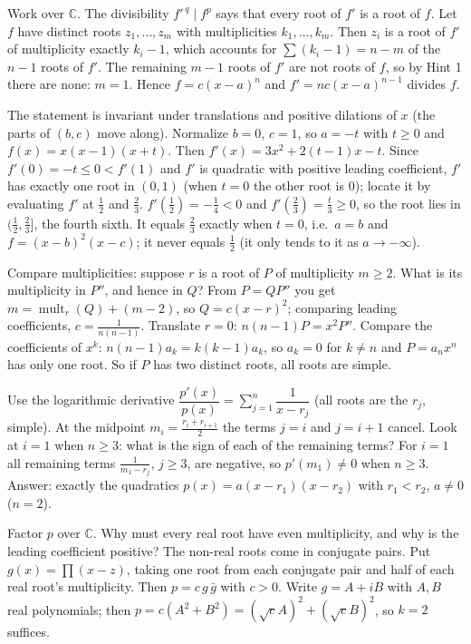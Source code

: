 \documentclass[11pt,a4paper]{article}
\begin{document}

 Work over $\mathbb{C}$. The divisibility $f'^{\,q}\mid f^p$ says that every root of $f'$ is a root of $f$.
 Let $f$ have distinct roots $z_1,\dots,z_m$ with multiplicities $k_1,\dots,k_m$. Then $z_i$ is a root of $f'$ of multiplicity exactly $k_i-1$, which accounts for $\sum(k_i-1)=n-m$ of the $n-1$ roots of $f'$.
 The remaining $m-1$ roots of $f'$ are not roots of $f$, so by Hint 1 there are none: $m=1$. Hence $f=c(x-a)^n$ and $f'=nc(x-a)^{n-1}$ divides $f$.

 The statement is invariant under translations and positive dilations of $x$ (the parts of $(b,c)$ move along). Normalize $b=0$, $c=1$, so $a=-t$ with $t\ge 0$ and $f(x)=x(x-1)(x+t)$.
 Then $f'(x)=3x^2+2(t-1)x-t$. Since $f'(0)=-t\le 0<f'(1)$ and $f'$ is quadratic with positive leading coefficient, $f'$ has exactly one root in $(0,1)$ (when $t=0$ the other root is $0$); locate it by evaluating $f'$ at $\tfrac12$ and $\tfrac23$.
 $f'(\tfrac12)=-\tfrac14<0$ and $f'(\tfrac23)=\tfrac t3\ge0$, so the root lies in $(\tfrac12,\tfrac23]$, the fourth sixth. It equals $\tfrac23$ exactly when $t=0$, i.e.\ $a=b$ and $f=(x-b)^2(x-c)$; it never equals $\tfrac12$ (it only tends to it as $a\to-\infty$).

 Compare multiplicities: suppose $r$ is a root of $P$ of multiplicity $m\ge2$. What is its multiplicity in $P''$, and hence in $Q$?
 From $P=QP''$ you get $m=\operatorname{mult}_r(Q)+(m-2)$, so $Q=c(x-r)^2$; comparing leading coefficients, $c=\frac1{n(n-1)}$.
 Translate $r=0$: $n(n-1)P=x^2P''$. Compare the coefficients of $x^k$: $n(n-1)a_k=k(k-1)a_k$, so $a_k=0$ for $k\ne n$ and $P=a_nx^n$ has only one root. So if $P$ has two distinct roots, all roots are simple.

 Use the logarithmic derivative $\dfrac{p'(x)}{p(x)}=\sum_{j=1}^n\dfrac1{x-r_j}$ (all roots are the $r_j$, simple).
 At the midpoint $m_i=\frac{r_i+r_{i+1}}2$ the terms $j=i$ and $j=i+1$ cancel. Look at $i=1$ when $n\ge3$: what is the sign of each of the remaining terms?
 For $i=1$ all remaining terms $\frac1{m_1-r_j}$, $j\ge3$, are negative, so $p'(m_1)\ne0$ when $n\ge 3$. Answer: exactly the quadratics $p(x)=a(x-r_1)(x-r_2)$ with $r_1<r_2$, $a\ne0$ ($n=2$).

 Factor $p$ over $\mathbb{C}$. Why must every real root have even multiplicity, and why is the leading coefficient positive?
 The non-real roots come in conjugate pairs. Put $g(x)=\prod(x-z)$, taking one root from each conjugate pair and half of each real root's multiplicity. Then $p=c\,g\,\bar g$ with $c>0$.
 Write $g=A+iB$ with $A,B$ real polynomials; then $p=c(A^2+B^2)=(\sqrt cA)^2+(\sqrt cB)^2$, so $k=2$ suffices.
\end{document}
